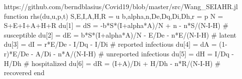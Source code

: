 https://github.com/berndblasius/Covid19/blob/master/src/Wang_SEIAHR.jl
function rhs(du,u,p,t)
  S,E,I,A,H,R = u
  b,alpha,n,De,Dq,Di,Dh,r = p
  N = S+E+I+A+H+R
  du[1] = dS = -b*S*(I+alpha*A)/N + n - n*S/(N-I-H)   # susceptible
  du[2] = dE = b*S*(I+alpha*A)/N - E/De - n*E/(N-I-H) # latent
  du[3] = dI = r*E/De - I/Dq - I/Di                   # reported infectious
  du[4] = dA = (1-r)*E/De - A/Di - n*A/(N-I-H)        # unreported infectious
  du[5] = dH = I/Dq - H/Dh                            # hospitalized
  du[6] = dR = (I+A)/Di + H/Dh - n*R/(N-I-H)          # recovered
end

